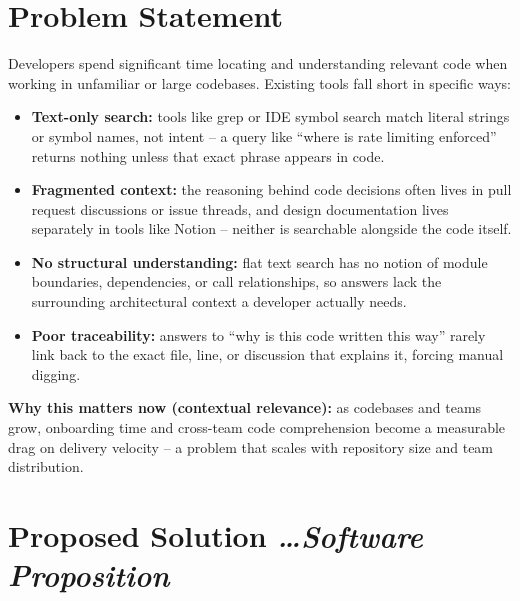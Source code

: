 \documentclass[11pt,a4paper]{article}
\newcommand{\BvrHint}[1]{%
  {\normalfont\normalsize\itshape\hfill #1}}
\begin{document}
\section{Problem Statement}
Developers spend significant time locating and
understanding relevant code when working in unfamiliar
or large codebases. Existing tools fall short in
specific ways:
\begin{itemize}[leftmargin=0.7cm]
    \item \textbf{Text-only search:} tools like grep or IDE symbol search match literal strings or symbol names, not intent -- a query like ``where is rate limiting enforced'' returns nothing unless that exact phrase appears in code.
    \item \textbf{Fragmented context:} the reasoning behind code decisions often lives in pull request discussions or issue threads, and design documentation lives separately in tools like Notion -- neither is searchable alongside the code itself.
    \item \textbf{No structural understanding:} flat text search has no notion of module boundaries, dependencies, or call relationships, so answers lack the surrounding architectural context a developer actually needs.
    \item \textbf{Poor traceability:} answers to ``why is this code written this way'' rarely link back to the exact file, line, or discussion that explains it, forcing manual digging.
\end{itemize}

\textbf{Why this matters now (contextual relevance):} as codebases and teams grow, onboarding time and cross-team code comprehension become a measurable drag on delivery velocity -- a problem that scales with repository size and team distribution.

\section{Proposed Solution %
\BvrHint{\ldots Software Proposition}}
\end{document}

